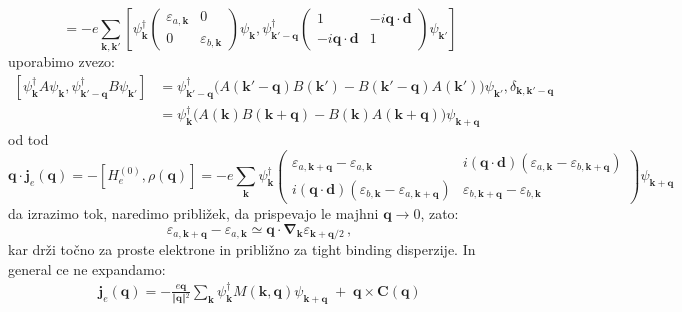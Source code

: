 \documentclass[a4paper,10pt]{article}
\renewcommand{\vec}[1]{\mathbf{#1}}
\begin{document}
\begin{equation}
[H_e^{(0)}, \rho(\vec{q})] =  -e \sum_{\vec{k}, \vec{k'}} \left[ \psi_{\vec{k}}^\dagger \begin{pmatrix} \varepsilon_{a,\vec{k}} & 0 \\ 0 & \varepsilon_{b,\vec{k}} \end{pmatrix} \psi_{\vec{k}}, \psi_{\vec{k'} - \vec{q}}^\dagger \begin{pmatrix} 1 & -i\vec{q}\cdot\vec{d} \\ -i\vec{q}\cdot\vec{d} & 1 \end{pmatrix} \psi_{\vec{k'}} \right]
\end{equation}
uporabimo zvezo:
\begin{align}
  \left[ \psi_{\vec{k}}^\dagger A \psi_{\vec{k}}, \psi_{\vec{k}'-\vec{q}}^\dagger B \psi_{\vec{k}'} \right] &= \psi_{\vec{k}'-\vec{q}}^\dagger \Big( A(\vec{k}'-\vec{q}) B(\vec{k}') - B(\vec{k}'-\vec{q}) A(\vec{k}') \Big) \psi_{\vec{k}'} , \delta_{\vec{k},  \vec{k}'-\vec{q}} \\ &= \psi_{\vec{k}}^\dagger \Big( A(\vec{k}) B(\vec{k}+\vec{q}) - B(\vec{k}) A(\vec{k}+\vec{q}) \Big) \psi_{\vec{k}+\vec{q}}
\end{align}
od tod 
\begin{equation}
\vec{q} \cdot \vec{j}_e(\vec{q}) = -[H_e^{(0)}, \rho(\vec{q})] = -e \sum_{\vec{k}} \psi_{\vec{k}}^\dagger  \begin{pmatrix} \varepsilon_{a,\vec{k}+\vec{q}} - \varepsilon_{a,\vec{k}} & i(\vec{q}\cdot\vec{d})\left(\varepsilon_{a,\vec{k}} - \varepsilon_{b,\vec{k}+\vec{q}}\right) \\ i(\vec{q}\cdot\vec{d})\left(\varepsilon_{b,\vec{k}} - \varepsilon_{a,\vec{k}+\vec{q}}\right) & \varepsilon_{b,\vec{k}+\vec{q}} - \varepsilon_{b,\vec{k}} \end{pmatrix}  \psi_{\vec{k}+\vec{q}}
\end{equation}
da izrazimo tok, naredimo približek, da prispevajo le majhni $\vec{q}\to 0$, zato:
\begin{equation}
\varepsilon_{a, \vec{k}+\vec{q}}- \varepsilon_{a,\vec{k}}   \simeq  \vec{q} \cdot \vec{\nabla}_{\vec{k}} \varepsilon_{\vec{k}+\vec{q}/2}\,,
\end{equation}
kar drži točno za proste elektrone in približno za tight binding disperzije. 
In general ce ne expandamo: 
\begin{align}
  \mathbf{j}_e(\mathbf{q}) = -\frac{e\mathbf{q}}{\Vert{}\mathbf{q}\Vert{}^2} \sum_{\mathbf{k}} \psi_\mathbf{k}^\dagger {M}(\mathbf{k}, \mathbf{q}) \psi_{\mathbf{k}+\mathbf{q}} \;+\; \mathbf{q} \times \mathbf{C}(\mathbf{q})
\end{align}
\end{document}
